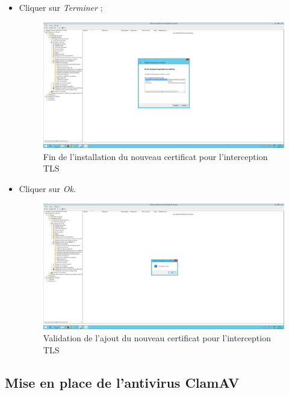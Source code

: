 \begin{itemize}
\item Cliquer sur \textit{Terminer} ;
\begin{figure}[h!]
    \begin{center}
        \includegraphics[scale=0.20]{Interception_Screenshots/GPO8.png}
        \caption{Fin de l'installation du nouveau certificat pour l'interception TLS}
    \end{center}
\end{figure}
\FloatBarrier 

\item Cliquer sur \textit{Ok}.
\begin{figure}[h!]
    \begin{center}
        \includegraphics[scale=0.20]{Interception_Screenshots/GPO9.png}
        \caption{Validation de l'ajout du nouveau certificat pour l'interception TLS}
    \end{center}
\end{figure}
\FloatBarrier 

\end{itemize}


\subsection{Mise en place de l'antivirus ClamAV}

